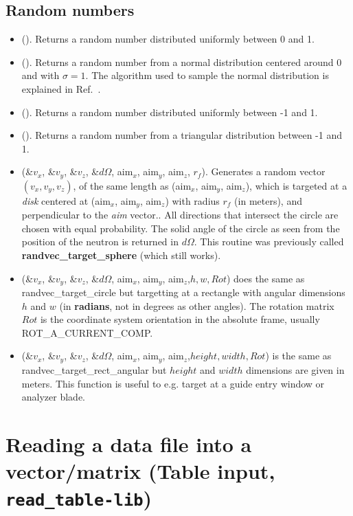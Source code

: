 \subsection{Random numbers}
\begin{itemize}
\item {}(). Returns a random number distributed uniformly between 0 and 1.
\item {}(). Returns a random number from a normal
  distribution centered around 0 and with $\sigma=1$. The algorithm used to
  sample the normal distribution is explained in Ref.~\cite[ch.7]{num_rep}.
\item {}(). Returns a random number distributed uniformly between -1 and 1.
\item {}(). Returns a random number from a triangular distribution between -1 and 1.
\item {}(\&$v_x$, \&$v_y$, \&$v_z$, \&$d\Omega$,
  aim$_x$, aim$_y$, aim$_z$, $r_f$). Generates a random vector $(v_x, v_y,
  v_z)$, of the same length as (aim$_x$, aim$_y$, aim$_z$), which is
  targeted at a \emph{disk} centered at (aim$_x$, aim$_y$, aim$_z$) with
  radius $r_f$ (in meters), and perpendicular to the \emph{aim} vector.. All directions
  that intersect the circle are chosen with equal probability. The solid
  angle of the circle as seen from the position of the neutron is returned
  in $d\Omega$. This routine was previously called \textbf{randvec\_target\_sphere}
  (which still works).
\item {}(\&$v_x$, \&$v_y$, \&$v_z$,
  \&$d\Omega$, aim$_x$, aim$_y$, aim$_z$,$h, w, Rot$) does the same as
  randvec\_target\_circle but targetting at a rectangle with angular dimensions
  $h$ and $w$ (in \textbf{radians}, not in degrees as other angles). The
  rotation matrix $Rot$ is the coordinate system orientation in the absolute
  frame, usually ROT\_A\_CURRENT\_COMP.
\item {}(\&$v_x$, \&$v_y$, \&$v_z$,
  \&$d\Omega$, aim$_x$, aim$_y$, aim$_z$,$height, width, Rot$) is the same as
  randvec\_target\_rect\_angular but $height$ and $width$ dimensions are given
  in meters. This function is useful to e.g. target at a guide entry window
  or analyzer blade.
\end{itemize}

\section{Reading a data file into a vector/matrix (Table input, \texttt{read\_table-lib})}
\label{s:read-table}

